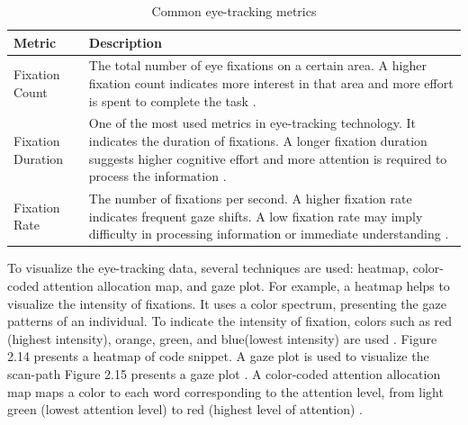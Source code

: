 \begin{table}[H]
\centering
\small %
\caption{Common eye-tracking metrics}
\label{tab:eye_tracking_metrics}
\begin{tabular}{p{} | p{}}
\hline
\rule{0pt}{1.2em}\textbf{Metric} & \textbf{Description} \\[0.5em]
\hline
\rule{0pt}{1.2em}Fixation Count & The total number of eye fixations on a certain area. A higher fixation count indicates more interest in that area and more effort is spent to complete the task \cite{obaidellah2018survey}. \\[0.5em]
\hline
\rule{0pt}{1.2em}Fixation Duration & One of the most used metrics in eye-tracking technology. It indicates the duration of fixations. A longer fixation duration suggests higher cognitive effort and more attention is required to process the information \cite{junior5005089understanding}. \\[0.5em]
\hline
\rule{0pt}{1.2em}Fixation Rate & The number of fixations per second. A higher fixation rate indicates frequent gaze shifts. A low fixation rate may imply difficulty in processing information or immediate understanding \cite{bauer2017indentations}. \\[0.5em]
\hline
\end{tabular}
\end{table}






To visualize the eye-tracking data, several techniques are used: heatmap, color-coded attention allocation map, and gaze plot. For example, a heatmap helps to visualize the intensity of fixations. It uses a color spectrum, presenting the gaze patterns of an individual. 
To indicate the intensity of fixation, colors such as red (highest intensity), orange, green, and blue(lowest intensity) are used \cite{sharafi2015systematic}. Figure 2.14 presents a heatmap of code snippet. A gaze plot is used to visualize the scan-path Figure 2.15 presents a gaze plot \cite{sharafi2015systematic}. A color-coded attention allocation map maps a color to each word corresponding to the attention level, from light green (lowest attention level) to red (highest level of attention) \cite{sharafi2015systematic}.

